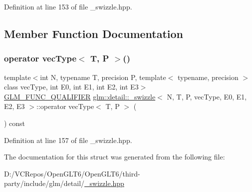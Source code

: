Definition at line 153 of file \+\_\+swizzle.\+hpp.



\subsection{Member Function Documentation}
\mbox{\label{structglm_1_1detail_1_1__swizzle_a61812f7b0b36f71a48fb45947a6a94fb}} 
\subsubsection{\texorpdfstring{operator vecType$<$ T, P $>$()}{operator vecType< T, P >()}}
{\footnotesize\ttfamily template$<$int N, typename T, precision P, template$<$ typename, precision $>$ class vec\+Type, int E0, int E1, int E2, int E3$>$ \\
\mbox{\hyperlink{setup_8hpp_a33fdea6f91c5f834105f7415e2a64407}{G\+L\+M\+\_\+\+F\+U\+N\+C\+\_\+\+Q\+U\+A\+L\+I\+F\+I\+ER}} \mbox{\hyperlink{structglm_1_1detail_1_1__swizzle}{glm\+::detail\+::\+\_\+swizzle}}$<$ N, T, P, vec\+Type, E0, E1, E2, E3 $>$\+::operator vec\+Type$<$ T, P $>$ (\begin{DoxyParamCaption}{ }\end{DoxyParamCaption}) const\hspace{0.3cm}{\ttfamily [inline]}}



Definition at line 157 of file \+\_\+swizzle.\+hpp.



The documentation for this struct was generated from the following file\+:\begin{DoxyCompactItemize}
\item 
D\+:/\+V\+C\+Repos/\+Open\+G\+L\+T6/\+Open\+G\+L\+T6/third-\/party/include/glm/detail/\mbox{\hyperlink{__swizzle_8hpp}{\+\_\+swizzle.\+hpp}}\end{DoxyCompactItemize}
